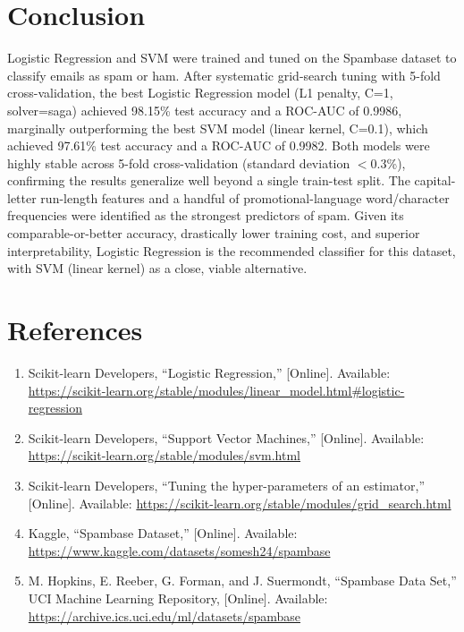 \documentclass[12pt,a4paper]{article}
\begin{document}
\section{Conclusion}
Logistic Regression and SVM were trained and tuned on the Spambase dataset to classify emails as
spam or ham. After systematic grid-search tuning with 5-fold cross-validation, the best
Logistic Regression model (L1 penalty, C=1, solver=saga) achieved 98.15\% test accuracy and a
ROC-AUC of 0.9986, marginally outperforming the best SVM model (linear kernel, C=0.1), which
achieved 97.61\% test accuracy and a ROC-AUC of 0.9982. Both models were highly stable across
5-fold cross-validation (standard deviation $<$0.3\%), confirming the results generalize well
beyond a single train-test split. The capital-letter run-length features and a handful of
promotional-language word/character frequencies were identified as the strongest predictors of
spam. Given its comparable-or-better accuracy, drastically lower training cost, and superior
interpretability, Logistic Regression is the recommended classifier for this dataset, with SVM
(linear kernel) as a close, viable alternative.

\section{References}
\begin{enumerate}
\item Scikit-learn Developers, ``Logistic Regression,'' [Online]. Available: \url{https://scikit-learn.org/stable/modules/linear_model.html#logistic-regression}
\item Scikit-learn Developers, ``Support Vector Machines,'' [Online]. Available: \url{https://scikit-learn.org/stable/modules/svm.html}
\item Scikit-learn Developers, ``Tuning the hyper-parameters of an estimator,'' [Online]. Available: \url{https://scikit-learn.org/stable/modules/grid_search.html}
\item Kaggle, ``Spambase Dataset,'' [Online]. Available: \url{https://www.kaggle.com/datasets/somesh24/spambase}
\item M. Hopkins, E. Reeber, G. Forman, and J. Suermondt, ``Spambase Data Set,'' UCI Machine Learning Repository, [Online]. Available: \url{https://archive.ics.uci.edu/ml/datasets/spambase}
\end{enumerate}
\end{document}
